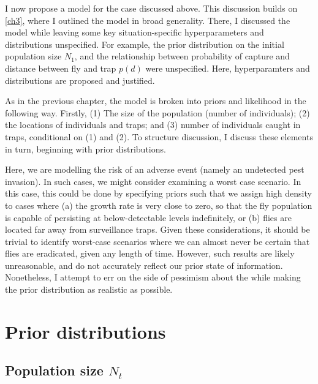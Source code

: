 \documentclass[
  oneside]{book}
\begin{document}
I now propose a model for the case discussed above. This discussion builds on \ref{ch3}, where I outlined the model in broad generality. There, I discussed the model while leaving some key situation-specific hyperparameters and distributions unspecified. For example, the prior distribution on the initial population size \(N_1\), and the relationship between probability of capture and distance between fly and trap \(p(d)\) were unspecified. Here, hyperparamters and distributions are proposed and justified.

As in the previous chapter, the model is broken into priors and likelihood in the following way. Firstly, (1) The size of the population (number of individuals); (2) the locations of individuals and traps; and (3) number of individuals caught in traps, conditional on (1) and (2). To structure discussion, I discuss these elements in turn, beginning with prior distributions.

Here, we are modelling the risk of an adverse event (namely an undetected pest invasion). In such cases, we might consider examining a worst case scenario. In this case, this could be done by specifying priors such that we assign high density to cases where (a) the growth rate is very close to zero, so that the fly population is capable of persisting at below-detectable levels indefinitely, or (b) flies are located far away from surveillance traps. Given these considerations, it should be trivial to identify worst-case scenarios where we can almost never be certain that flies are eradicated, given any length of time. However, such results are likely unreasonable, and do not accurately reflect our prior state of information. Nonetheless, I attempt to err on the side of pessimism about the while making the prior distribution as realistic as possible.

\hypertarget{prior-distributions}{%
\section{Prior distributions}\label{prior-distributions}}

\hypertarget{popn-size}{%
\subsection{\texorpdfstring{Population size \(N_t\)}{Population size N\_t}}\label{popn-size}}
\end{document}
